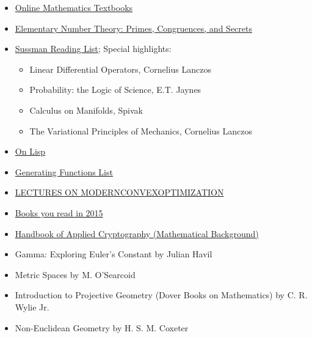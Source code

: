 \begin{itemize}

	\item \href{http://people.math.gatech.edu/~cain/textbooks/onlinebooks.html}{Online Mathematics Textbooks}

	\item \href{http://wstein.org/ent/}{Elementary Number Theory: Primes, Congruences, and Secrets}
	
	\item \href{http://aurellem.org/thoughts/html/sussman-reading-list.html}{Sussman
  Reading List}; Special highlights:

	\begin{itemize}
		\item Linear Differential Operators, Cornelius Lanczos
		\item Probability: the Logic of Science, E.T. Jaynes
		\item Calculus on Manifolds, Spivak
		\item The Variational Principles of Mechanics, Cornelius Lanczos
	\end{itemize}

	\item \href{http://www.paulgraham.com/onlisptext.html}{On Lisp}

	\item \href{http://lacim.uqam.ca/~plouffe/articles/MasterThesis.pdf}{Generating Functions List}

	\item \href{http://www2.isye.gatech.edu/~nemirovs/Lect_ModConvOpt.pdf}{LECTURES
  ON MODERNCONVEXOPTIMIZATION}

	\item \href{https://news.ycombinator.com/item?id=10783219}{Books you read in 2015}

	\item \href{Handbook of Applied Cryptography - Chapter02.pdf}{Handbook of Applied Cryptography (Mathematical Background)}

	\item Gamma: Exploring Euler's Constant by Julian Havil

	\item Metric Spaces by M. O'Searcoid

	\item Introduction to Projective Geometry (Dover Books on Mathematics) by C. R. Wylie Jr.

	\item Non-Euclidean Geometry by H. S. M. Coxeter


\end{itemize}
